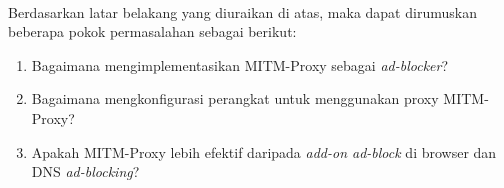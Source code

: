 \documentclass[./bab_1.tex]{subfiles}
\begin{document}
  \paragraph*{}Berdasarkan latar belakang yang diuraikan di
  atas, maka dapat dirumuskan beberapa pokok permasalahan
  sebagai berikut:
  \begin{enumerate}
    \item Bagaimana mengimplementasikan MITM-Proxy sebagai
      \textit{ad-blocker}?
    \item Bagaimana mengkonfigurasi perangkat untuk
      menggunakan proxy MITM-Proxy?
    \item Apakah MITM-Proxy lebih efektif daripada
      \textit{add-on ad-block} di browser dan DNS
      \textit{ad-blocking}?
  \end{enumerate}
\end{document}
